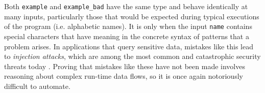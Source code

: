 \begin{enumerate}
Both \lstinline{example} and \lstinline{example_bad} have the same type and behave identically at many inputs, particularly those that would be expected during typical executions of the program (i.e. alphabetic names). It is only when the input \lstinline{name} contains special characters that have meaning in the concrete syntax of patterns that a problem arises. In applications that query sensitive data, mistakes like this lead to \emph{injection attacks}, which are among the most common and catastrophic security threats today \cite{owasp2013}. Proving that mistakes like these have not been made involves reasoning about complex run-time data flows, so it is once again notoriously difficult to automate. 

\end{enumerate}



